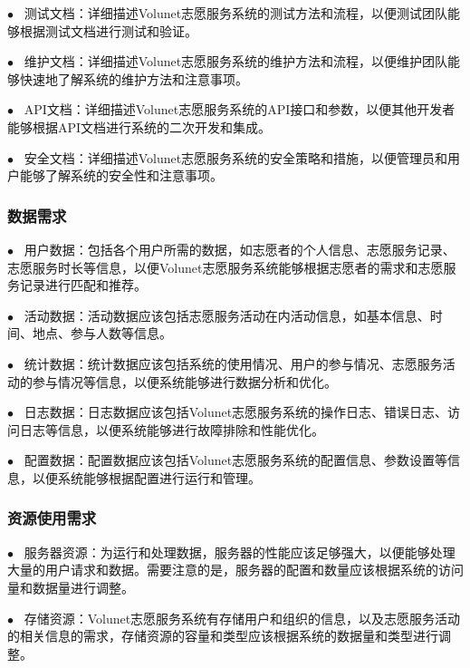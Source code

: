  $\bullet   \enspace$ 测试文档：详细描述Volunet志愿服务系统的测试方法和流程，以便测试团队能够根据测试文档进行测试和验证。
 \hfill 
 
 $\bullet   \enspace$ 维护文档：详细描述Volunet志愿服务系统的维护方法和流程，以便维护团队能够快速地了解系统的维护方法和注意事项。
 \hfill 
 
 $\bullet   \enspace$ API文档：详细描述Volunet志愿服务系统的API接口和参数，以便其他开发者能够根据API文档进行系统的二次开发和集成。
 \hfill 
 
 $\bullet   \enspace$ 安全文档：详细描述Volunet志愿服务系统的安全策略和措施，以便管理员和用户能够了解系统的安全性和注意事项。
 \hfill 
 
\subsubsection{数据需求}

 $\bullet   \enspace$ 用户数据：包括各个用户所需的数据，如志愿者的个人信息、志愿服务记录、志愿服务时长等信息，以便Volunet志愿服务系统能够根据志愿者的需求和志愿服务记录进行匹配和推荐。
 \hfill 
 
 
 $\bullet   \enspace$ 活动数据：活动数据应该包括志愿服务活动在内活动信息，如基本信息、时间、地点、参与人数等信息。
 \hfill 
 
 $\bullet   \enspace$ 统计数据：统计数据应该包括系统的使用情况、用户的参与情况、志愿服务活动的参与情况等信息，以便系统能够进行数据分析和优化。
 \hfill 
 
 $\bullet   \enspace$ 日志数据：日志数据应该包括Volunet志愿服务系统的操作日志、错误日志、访问日志等信息，以便系统能够进行故障排除和性能优化。
 \hfill 
 
 $\bullet   \enspace$ 配置数据：配置数据应该包括Volunet志愿服务系统的配置信息、参数设置等信息，以便系统能够根据配置进行运行和管理。
 \hfill 
 
\subsubsection{资源使用需求}
$\bullet   \enspace$ 服务器资源：为运行和处理数据，服务器的性能应该足够强大，以便能够处理大量的用户请求和数据。需要注意的是，服务器的配置和数量应该根据系统的访问量和数据量进行调整。
\hfill 

$\bullet   \enspace$ 存储资源：Volunet志愿服务系统有存储用户和组织的信息，以及志愿服务活动的相关信息的需求，存储资源的容量和类型应该根据系统的数据量和类型进行调整。
\hfill 

